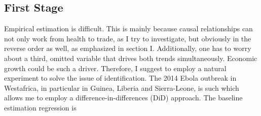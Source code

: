 \documentclass{article}
\begin{document}
\subsection{First Stage}

Empirical estimation is difficult. This is mainly because causal relationships can not only work from health to trade, as I try to investigate, but obviously in the reverse order as well, as emphasized in section I. Additionally, one has to worry about a third, omitted variable that drives both trends simultaneously. Economic growth could be such a driver. Therefore, I suggest to employ a natural experiment to solve the issue of identification. The 2014 Ebola outbreak in Westafrica, in particular in Guinea, Liberia and Sierra-Leone, is such which allows me to employ a difference-in-differences (DiD) approach.
The baseline estimation regression is
\end{document}

